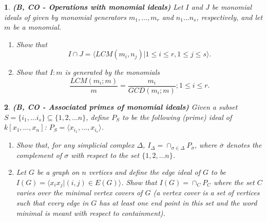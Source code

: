 \documentclass[11pt]{article}
\theoremstyle{problem}
\newtheorem{p}{}
\begin{document}
\pagestyle{empty}

\thispagestyle{myheadings}


\bigskip 

\bigskip 

\bigskip 




\begin{p} {\bf (B, CO - Operations with monomial ideals)}
 Let $I$ and $J$ be monomial ideals of  given by monomial generators $m_1, \ldots ,m_r$ and $n_1 \ldots n_s$, respectively, and let $m$ be a monomial.
 \begin{enumerate}
\item Show that
$$I \cap J = \langle LCM(m_i,n_j)| 1\leq i\leq r, 1\leq j\leq s \rangle.$$
\item Show that $I : m$ is generated by the monomials
$$\frac{LCM(m_i;m)}{m} = \frac{m_i}{GCD(m_i;m)}; 1\leq i\leq r.$$
\end{enumerate}
\end{p}


\begin{p} {\bf (B, CO - Associated primes of monomial ideals)}
Given a subset $S=\{i_1,\ldots i_s \}\subseteq \{1,2,\ldots n\}$, define $P_S$ to be the following (prime) ideal of $k[x_1,\ldots,x_n]$: $P_S=\langle x_{i_1},\ldots,x_{i_s} \rangle $. 
\begin{enumerate}
\item Show that, for any simplicial complex $\Delta$, $I_{\Delta}=\cap_{\sigma\in\Delta} P_{\overline{\sigma}}$, where $\overline{\sigma}$ denotes the complement of $\sigma$ with respect to the set $\{1,2,\ldots n\}$.
\item Let $G$ be a graph on $n$ vertices and define the {\em edge ideal} of $G$ to be $I(G)=\langle x_ix_j | (i,j)\in E(G)\rangle$. Show that $I(G)=\cap_{C} P_C$ where the set $C$ varies over the {\em minimal vertex covers} of $G$  (a vertex cover is a set of vertices such that every edge in $G$ has at least one end point in this set and the word minimal is meant with respect to containment).
\end{enumerate}
\end{p}
\end{document}
